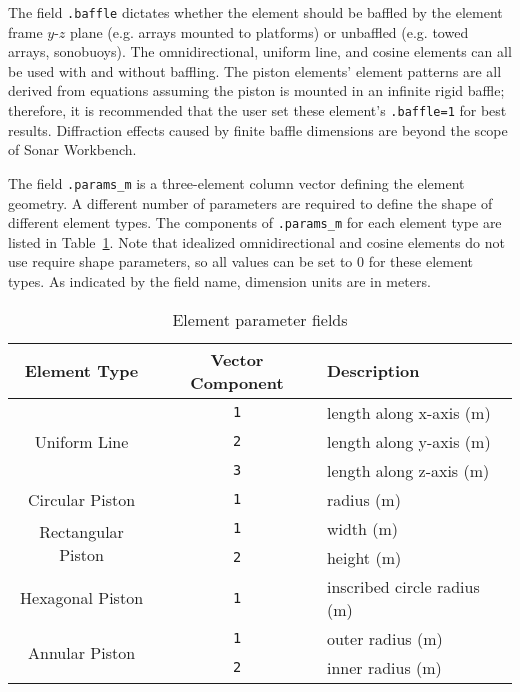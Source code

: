 The field \texttt{.baffle} dictates whether the element should be baffled by the element frame $y$-$z$ plane (e.g. arrays mounted to platforms) or unbaffled (e.g. towed arrays, sonobuoys). The omnidirectional, uniform line, and cosine elements can all be used with and without baffling. The piston elements' element patterns are all derived from equations assuming the piston is mounted in an infinite rigid baffle; therefore, it is recommended that the user set these element's \texttt{.baffle=1} for best results. Diffraction effects caused by finite baffle dimensions are beyond the scope of Sonar Workbench. 

The field \texttt{.params\_m} is a three-element column vector defining the element geometry. A different number of parameters are required to define the shape of different element types. The components of \texttt{.params\_m} for each element type are listed in Table~\ref{tab:ElementParams}. Note that idealized omnidirectional and cosine elements do not use require shape parameters, so all values can be set to 0 for these element types. As indicated by the field name, dimension units are in meters.

\begin{table}[!ht]
	\begin{center}
		\caption{Element parameter fields}
		\label{tab:ElementParams}
		\begin{tabular}{c|c|l} 
			\textbf{Element Type} & \textbf{Vector Component} & \textbf{Description} \\
			\hline
			\multirow{3}{*}{Uniform Line} & \texttt{1} & length along x-axis (m)\\
			& \texttt{2} & length along y-axis (m)\\
			& \texttt{3} & length along z-axis (m)\\
			\hline
			Circular Piston & \texttt{1} & radius (m)\\
			\hline
			\multirow{2}{*}{Rectangular Piston} & \texttt{1} & width (m)\\
			& \texttt{2} & height (m)\\
			\hline
			Hexagonal Piston & \texttt{1} & inscribed circle radius (m)\\	
			\hline
			\multirow{2}{*}{Annular Piston} & \texttt{1} & outer radius (m)\\
			& \texttt{2} & inner radius (m)\\
		\end{tabular}
	\end{center}
\end{table}

